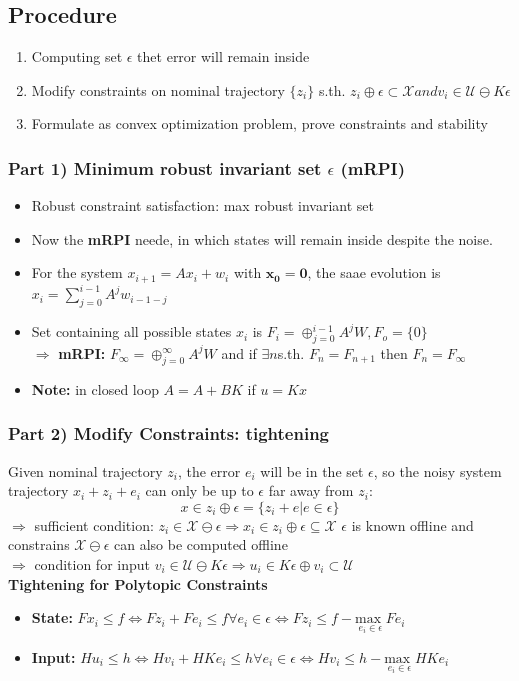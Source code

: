 \subsection{Procedure}
\begin{enumerate}
    \item Computing set $\epsilon$ thet error will remain inside
    \item Modify constraints on nominal trajectory $\{z_i\}$ s.th. $z_i \oplus \epsilon \subset \mathcal{X} and v_i \in \mathcal{U} \ominus K \epsilon$
    \item Formulate as convex optimization problem, prove constraints and stability
\end{enumerate}
\subsubsection{Part 1) Minimum robust invariant set $\epsilon$ (mRPI)}
\begin{itemize}
    \item Robust constraint satisfaction: max robust invariant set
    \item Now the \textbf{mRPI} neede, in which states will remain inside despite the noise.
    \item For the system $x_{i+1} = Ax_i + w_i$ with $\mathbf{x_0 = 0}$, the saae evolution is $x_i = \sum^{i-1}_{j=0}A^jw_{i-1-j}$
    \item Set containing all possible states $x_i$ is $F_i = \oplus^{i-1}_{j=0} A^jW,F_o = \{0\}$\\
    $\Rightarrow$ \textbf{mRPI:} $F_\infty = \oplus^\infty_{j=0}A^jW$ and if $\exists n $s.th. $F_n = F_{n+1}$ then $F_n = F_\infty$
    \item \textbf{Note:} in closed loop $A = A+BK$ if $u=Kx$
\end{itemize}
\subsubsection{Part 2) Modify Constraints: tightening}
Given nominal trajectory $z_i$, the error $e_i$ will be in the set $\epsilon
$, so the noisy system trajectory $x_i+z_i +e_i$ can only be up to $\epsilon$ far away from $z_i$:
\[x\in z_i \oplus \epsilon = \{z_i+e|e \in \epsilon\}\]
$\Rightarrow$ sufficient condition: $z_i \in \mathcal{X} \ominus\epsilon \Rightarrow x_i \in z_i \oplus\epsilon \subseteq \mathcal{X}$ $\epsilon$ is known offline and constrains $\mathcal{X}\ominus \epsilon$ can also be computed offline\\
$\Rightarrow$ condition for input $v_i \in \mathcal{U} \ominus K \epsilon \Rightarrow u_i \in K \epsilon \oplus v_i \subset \mathcal{U}$\\
\textbf{Tightening for Polytopic Constraints}
\begin{itemize}
    \item \textbf{State: } $Fx_i \leq f \Leftrightarrow Fz_i + Fe_i \leq f \forall e_i \in \epsilon \Leftrightarrow Fz_i \leq f - \underset{e_i\in\epsilon}{\textrm{max }}Fe_i$
    \item \textbf{Input: } $Hu_i \leq h \Leftrightarrow Hv_i + HKe_i\leq h \forall e_i \in \epsilon \Leftrightarrow H v_i \leq h - \underset{e_i\in\epsilon}{\textrm{max }} HK e_i$
\end{itemize}
